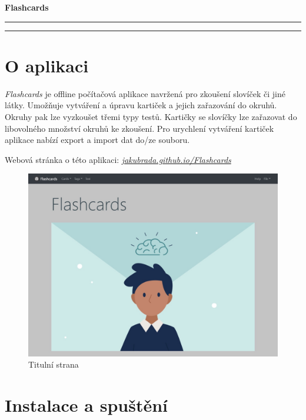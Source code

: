 \documentclass[11pt]{article}
\begin{document}
\begin{center}
  \textbf{\Huge Flashcards}\\
  \vspace{0.2cm}
  \rule{\textwidth}{0.5pt}
\end{center}
\tableofcontents
\begin{center}
  \rule{\textwidth}{0.5pt}
\end{center}
\clearpage
\hypertarget{o-aplikaci}{%
\section{O aplikaci}\label{o-aplikaci}}

\emph{Flashcards} je offline počítačová aplikace navržená pro zkoušení
slovíček či jiné látky. Umožňuje vytváření a úpravu kartiček a jejich
zařazování do okruhů. Okruhy pak lze vyzkoušet třemi typy testů.
Kartičky se slovíčky lze zařazovat do libovolného množství okruhů ke
zkoušení. Pro urychlení vytváření kartiček aplikace nabízí export a
import dat do/ze souboru.

Webová stránka o této aplikaci:
\href{https://jakubrada.github.io/Flashcards/}{\emph{jakubrada.github.io/Flashcards}}

\begin{figure}
\centering
\includegraphics{../../../../assets/title_page.jpg}
\caption{Titulní strana}
\end{figure}

\hypertarget{instalace-a-spuux161tux11bnuxed}{%
\section{Instalace a spuštění}\label{instalace-a-spuux161tux11bnuxed}}
\end{document}
